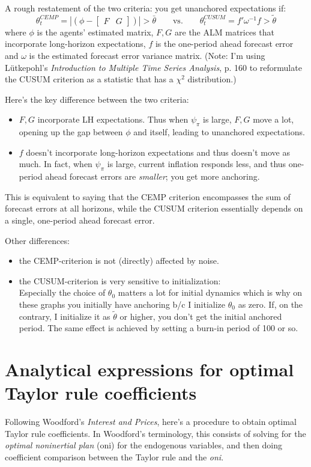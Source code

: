 \documentclass[11pt]{article}
\renewcommand{\[}{\begin{equation}}
\renewcommand{\]}{\end{equation}}
\begin{document}
A rough restatement of the two criteria: you get unanchored expectations if:
\begin{equation}
\theta_t^{CEMP} = | ( \phi - \begin{bmatrix} F & G \end{bmatrix}) | > \bar{\theta} \quad \quad \text{vs.} \quad \quad  \theta_t^{CUSUM} = f' \omega^{-1}f > \tilde{\theta}
\end{equation}
where $\phi$ is the agents' estimated matrix, $F,G$ are the ALM matrices that incorporate long-horizon expectations, $f$ is the one-period ahead forecast error and $\omega$ is the estimated forecast error variance matrix. (Note: I'm using L\"utkepohl's \emph{Introduction to Multiple Time Series Analysis}, p. 160 to reformulate the CUSUM criterion as a statistic that has a $\chi^2$ distribution.)

Here's the key difference between the two criteria:
\begin{itemize}
\item $F,G$ incorporate LH expectations. Thus when $\psi_{\pi}$ is large, $F,G$ move a lot, opening up the gap between $\phi$ and itself, leading to unanchored expectations.
\item $f$ doesn't incorporate long-horizon expectations and thus doesn't move as much. In fact, when $\psi_{\pi}$ is large, current inflation responds less, and thus one-period ahead forecast errors are \emph{smaller}; you get more anchoring. 
\end{itemize}

This is equivalent to saying that the CEMP criterion encompasses the sum of forecast errors at all horizons, while the CUSUM criterion essentially depends on a single, one-period ahead forecast error. 

Other differences:
\begin{itemize}
\item the CEMP-criterion is not (directly) affected by noise.
\item the CUSUM-criterion is very sensitive to initialization: \\
Especially the choice of $\theta_0$ matters a lot for initial dynamics which is why on these graphs you initially have anchoring b/c I initialize $\theta_0$ as zero. If, on the contrary, I initialize it as $\tilde{\theta}$ or higher, you don't get the initial anchored period. The same effect is achieved by setting a burn-in period of 100 or so.
\end{itemize}

\newpage
\section{Analytical expressions for optimal Taylor rule coefficients}
Following Woodford's \emph{Interest and Prices}, here's a procedure to obtain optimal Taylor rule coefficients. In Woodford's terminology, this consists of solving for the \emph{optimal noninertial plan} (oni) for the endogenous variables,  and then doing coefficient comparison between the Taylor rule and the \emph{oni}.
\end{document}
